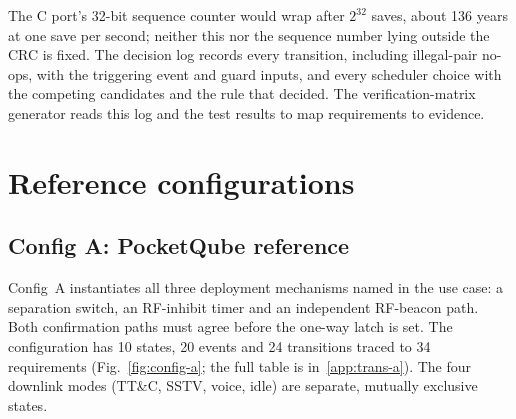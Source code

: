\documentclass[preprint,12pt]{elsarticle}
\newcommand{\cfgA}{Config~A}
\newcommand{\ttc}{TT\&C}
\begin{document}
The C port's 32-bit sequence counter would wrap after $2^{32}$ saves, about 136 years at one save per second; neither this nor the sequence number lying outside the CRC is fixed. The decision log records every transition, including illegal-pair no-ops, with the triggering event and guard inputs, and every scheduler choice with the competing candidates and the rule that decided. The verification-matrix generator reads this log and the test results to map requirements to evidence.

\section{Reference configurations}\label{sec:configs}

\subsection{Config A: PocketQube reference}

\cfgA{} instantiates all three deployment mechanisms named in the use case: a separation switch, an RF-inhibit timer and an independent RF-beacon path. Both confirmation paths must agree before the one-way  latch is set. The configuration has 10 states, 20 events and 24 transitions traced to 34 requirements (Fig.~\ref{fig:config-a}; the full table is in~\ref{app:trans-a}). The four downlink modes (\ttc{}, SSTV, voice, idle) are separate, mutually exclusive states.
\end{document}
